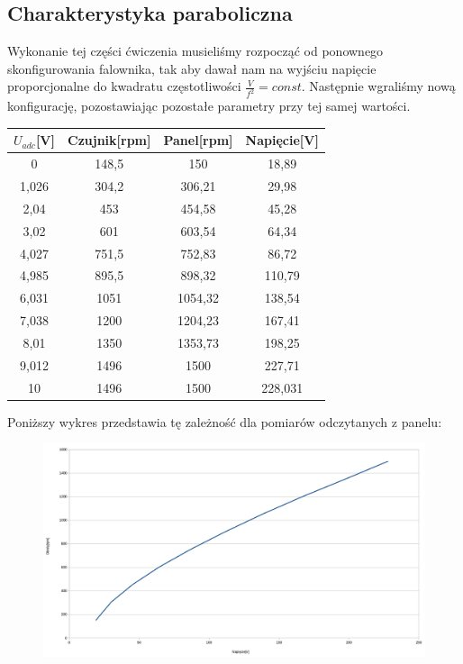 \documentclass[a4paper, 12pt]{article}
\begin{document}
		\subsection{Charakterystyka paraboliczna}
			Wykonanie tej części ćwiczenia musieliśmy rozpocząć od ponownego skonfigurowania falownika, tak aby dawał nam na wyjściu napięcie proporcjonalne do kwadratu częstotliwości $\frac{V}{f^2} = const$. Następnie wgraliśmy nową konfigurację, pozostawiając pozostałe parametry przy tej samej wartości.
			\begin{center}
				\begin{tabular}{|c|c|c|c|}
					\hline $U_{adc}$[V] & Czujnik[rpm] & Panel[rpm] & Napięcie[V]  \\ 
					\hline 0 	& 148,5	& 150 		& 18,89  \\ 
					\hline 1,026& 304,2 & 306,21 	& 29,98 \\ 
					\hline 2,04 & 453 	& 454,58 	& 45,28 \\ 
					\hline 3,02 & 601 	& 603,54 	& 64,34 \\ 
					\hline 4,027& 751,5 & 752,83 	& 86,72 \\ 
					\hline 4,985& 895,5 & 898,32 	& 110,79\\ 
					\hline 6,031& 1051 	& 1054,32 	& 138,54\\ 
					\hline 7,038& 1200 	& 1204,23 	& 167,41\\ 
					\hline 8,01 & 1350 	& 1353,73 	& 198,25\\ 
					\hline 9,012& 1496 	& 1500 		& 227,71\\ 
					\hline 10 	& 1496 	& 1500 		& 228,031\\ 
					\hline 
				\end{tabular} 
			\end{center}
			Poniższy wykres przedstawia tę zależność dla pomiarów odczytanych z panelu:
			\begin{figure}[H]
				\centering
				\includegraphics[width=\textwidth]{./img/trzecie.png}
			\end{figure}
\end{document}
